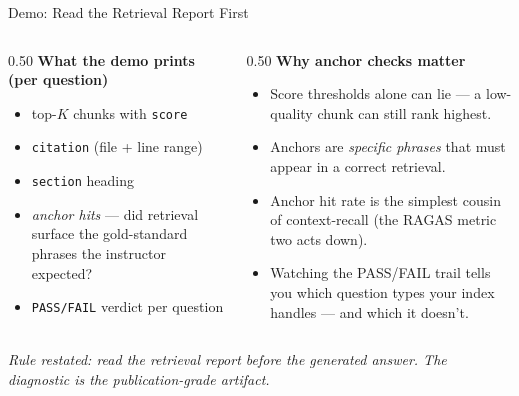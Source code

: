 \begin{frame}{Demo: Read the Retrieval Report First}
\begin{columns}[T]
\begin{column}{0.50\textwidth}
\textbf{What the demo prints (per question)}
\begin{itemize}\small
\item top-$K$ chunks with \texttt{score}
\item \texttt{citation} (file + line range)
\item \texttt{section} heading
\item \emph{anchor hits} --- did retrieval surface the gold-standard phrases the instructor expected?
\item \texttt{PASS/FAIL} verdict per question
\end{itemize}
\end{column}
\begin{column}{0.50\textwidth}
\textbf{Why anchor checks matter}
\begin{itemize}\small
\item Score thresholds alone can lie --- a low-quality chunk can still rank highest.
\item Anchors are \emph{specific phrases} that must appear in a correct retrieval.
\item Anchor hit rate is the simplest cousin of context-recall (the RAGAS metric two acts down).
\item Watching the PASS/FAIL trail tells you which question types your index handles --- and which it doesn't.
\end{itemize}
\end{column}
\end{columns}

\vspace{0.2cm}
\centering\textit{Rule restated: read the retrieval report \emph{before} the generated answer. The diagnostic is the publication-grade artifact.}
\end{frame}


